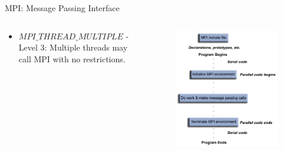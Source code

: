 \documentclass[10pt,times]{beamer}
\begin{document}
\begin{frame}{MPI: Message Passing Interface}
\begin{columns}
\begin{itemize}
\begin{itemize}
\item $MPI\_THREAD\_MULTIPLE$ - Level 3: Multiple threads may call MPI with no 
    restrictions. 
\end{itemize}
\end{itemize}
\begin{figure}
\includegraphics[width=\linewidth]{figs/mpi.png}
\end{figure}
\end{columns}
\end{frame}
\end{document}
